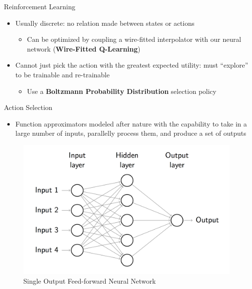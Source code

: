 \documentclass[final]{beamer}
\newlength{\onecolwid}
\newlength{\twocolwid}
\begin{document}
\begin{frame}[t]
\begin{columns}[t]
\begin{column}{\twocolwid}
\begin{columns}[t,totalwidth=\twocolwid]
\begin{column}{\onecolwid}
\begin{block}{Reinforcement Learning}
\begin{itemize}
				\item Usually discrete: no relation made between states or actions

				\begin{itemize}
					\item Can be optimized by coupling a wire-fitted interpolator with our neural network (\textbf{Wire-Fitted Q-Learning})
				\end{itemize}

				\item Cannot just pick the action with the greatest expected utility: must ``explore'' to be trainable and re-trainable
				\begin{itemize}
					\item Use a \textbf{Boltzmann Probability Distribution} selection policy
				\end{itemize}
			\end{itemize}
			\vspace{-1.25cm}
		\end{block}
		\begin{block}{Action Selection}
			\begin{itemize}
				\item Function approximators modeled after nature with the capability to take in a large number of inputs, parallelly process them, and produce a set of outputs
			\end{itemize}
			\vspace{-1.2cm}
			\begin{figure}
				\centering
				\includegraphics[width=.8\linewidth]{Figures/FeedForwardRendered}
				\caption{Single Output Feed-forward Neural Network}
				\label{fig:feedforward}
			\end{figure}
			\vspace{-3cm}
		\end{block}
	\end{column}


\end{columns}
\end{column}
\end{columns}
\end{frame}
\end{document}
